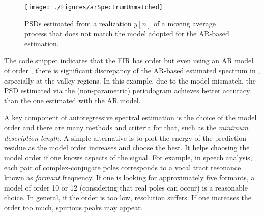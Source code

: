 \begin{figure}[htbp]
\centering
\texttt{[image: ./Figures/arSpectrumUnmatched]}
\caption{PSDs estimated from a realization $y[n]$ of a moving average process that does not match the model adopted for the AR-based estimation.\label{fig:arSpectrumUnmatched}}
\end{figure}

The code snippet indicates that the FIR has order  but even using an AR model of order , there is significant discrepancy of the AR-based estimated spectrum in , especially at the valley regions. In this example, due to the model mismatch, the PSD estimated via the (non-parametric) periodogram achieves better accuracy than the one estimated with the AR model.
\eExample

A key component of autoregressive spectral estimation is the choice of the model order and there are many methods and criteria for that, such as the \emph{minimum description length}. A simple alternative is to plot the energy of the prediction residue as the model order increases and choose the best. It helps choosing the model order if one knows aspects of the signal. For example, in speech analysis, each pair of complex-conjugate poles corresponds to a vocal tract resonance known as \emph{formant} frequency. If one is looking for approximately five formants, a model of order 10 or 12  (considering that real poles can occur) is a reasonable choice. In general, if the order is too low, resolution suffers. If one increases the order too much, spurious peaks may appear.

